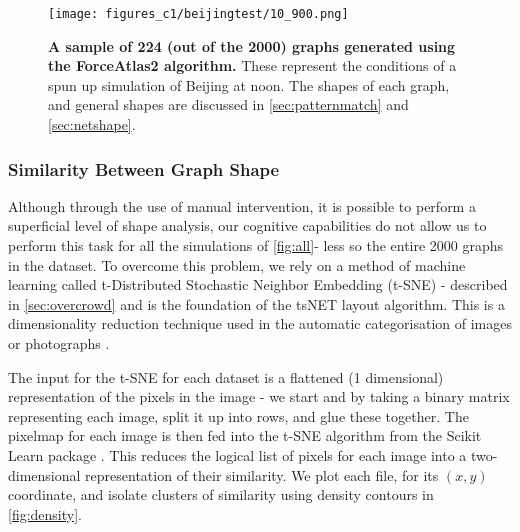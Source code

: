     \begin{figure}[H]
         \centering
     \texttt{[image: figures\_c1/beijingtest/10\_900.png]}
     \caption{\textbf{A sample of 224 (out of the 2000) graphs generated using the ForceAtlas2 algorithm.} These represent the conditions of a spun up simulation of Beijing at noon. The shapes of each graph, and general shapes are discussed in \autoref{sec:patternmatch} and \autoref{sec:netshape}.}
     \label{fig:all}
     \end{figure}




\subsubsection{Similarity Between Graph Shape}\label{sec:patternmatch}
Although through the use of manual intervention, it is possible to perform a superficial level of shape analysis, our cognitive capabilities do not allow us to perform this task for all the simulations of \autoref{fig:all}- less so the entire 2000 graphs in the dataset. To overcome this problem, we rely on a method of machine learning called t-Distributed Stochastic Neighbor Embedding (t-SNE) - described in \autoref{sec:overcrowd} and is the foundation of the tsNET layout algorithm. This is a dimensionality reduction technique used in the automatic categorisation of images or photographs \citep{truthandbeauty,sketchy}.

The input for the t-SNE for each dataset is a flattened (1 dimensional) representation of the pixels in the image - we start and by taking a binary matrix representing each image, split it up into rows, and glue these together. The pixelmap for each image is then fed into the t-SNE algorithm from the Scikit Learn package \citep{scikit-learn}. This reduces the logical list of pixels for each image into a two-dimensional representation of their similarity. We plot each file, for its $(x,y)$ coordinate, and isolate clusters of similarity using density contours in \autoref{fig:density}.

